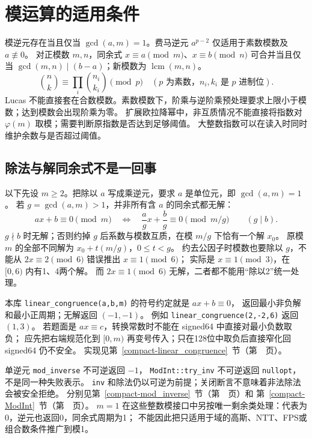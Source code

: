 \section{模运算的适用条件}\label{knowledge-modular-conditions}
模逆元存在当且仅当 $\gcd(a,m)=1$。费马逆元 $a^{p-2}$ 仅适用于素数模数及 $a\not\equiv0$。
对正模数 $m,n$，同余式 $x\equiv a\pmod m$、$x\equiv b\pmod n$ 可合并当且仅当
$\gcd(m,n)\mid(b-a)$；新模数为 $\operatorname{lcm}(m,n)$。
\[
\binom nk\equiv\prod_i\binom{n_i}{k_i}\pmod p\quad(p\text{ 为素数，}n_i,k_i\text{ 是 }p\text{ 进制位}).
\]
Lucas 不能直接套在合数模数。素数模数下，阶乘与逆阶乘预处理要求上限小于模数；达到模数会出现阶乘为零。
扩展欧拉降幂中，非互质情况不能直接将指数对 $\varphi(m)$ 取模；需要判断原指数是否达到足够阈值。
大整数指数可以在读入时同时维护余数与是否超过阈值。

\subsection{除法与解同余式不是一回事}
以下先设 $m\ge2$。把除以 $a$ 写成乘逆元，要求 $a$ 是单位元，即 $\gcd(a,m)=1$。
若 $g=\gcd(a,m)>1$，并非所有含 $a$ 的同余式都无解：
\[
ax+b\equiv0\pmod m
\quad\Longleftrightarrow\quad
\frac ag x+\frac bg\equiv0\pmod{m/g}\qquad(g\mid b).
\]
$g\nmid b$ 时无解；否则约掉 $g$ 后系数与模数互质，在模 $m/g$ 下恰有一个解 $x_0$。
原模 $m$ 的全部不同解为 $x_0+t(m/g)$，$0\le t<g$。
约去公因子时模数也要除以 $g$，不能从 $2x\equiv2\pmod6$ 错误推出 $x\equiv1\pmod6$；
实际是 $x\equiv1\pmod3$，在 $[0,6)$ 内有1、4两个解。
而 $2x\equiv1\pmod6$ 无解，二者都不能用“除以2”统一处理。

本库 \texttt{linear\_congruence(a,b,m)} 的符号约定就是 $ax+b\equiv0$，
返回最小非负解和最小正周期；无解返回 $(-1,-1)$。
例如 \texttt{linear\_congruence(2,-2,6)} 返回 $(1,3)$。
若题面是 $ax\equiv c$，转换常数时不能在 signed64 中直接对最小负数取负；
应先把右端规范化到 $[0,m)$ 再变号传入；只在128位中取负后直接窄化回 signed64 仍不安全。
实现见第~\ref{compact-linear_congruence}~节（第~\pageref{compact-linear_congruence}~页）。

单逆元 \texttt{mod\_inverse} 不可逆返回 $-1$，
\texttt{ModInt::try\_inv} 不可逆返回 \texttt{nullopt}，不是同一种失败表示。
\texttt{inv} 和除法仍以可逆为前提；关闭断言不意味着非法除法会被安全拒绝。
分别见第~\ref{compact-mod_inverse}~节（第~\pageref{compact-mod_inverse}~页）和
第~\ref{compact-ModInt}~节（第~\pageref{compact-ModInt}~页）。
$m=1$ 在这些整数模接口中另按唯一剩余类处理：代表为0，逆元也返回0，同余式周期为1；
不能因此把只适用于域的高斯、NTT、FPS或组合数条件推广到模1。

